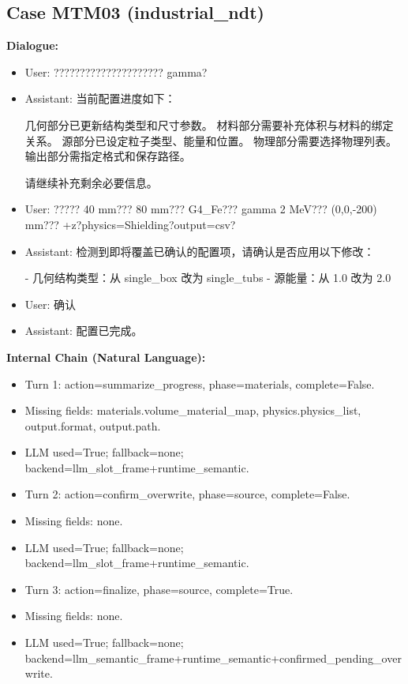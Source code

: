 \documentclass[11pt]{ctexart}
\begin{document}
\subsection{Case MTM03 (industrial\_ndt)}
\textbf{Dialogue:}
\begin{itemize}
\item User: ????????????????????? gamma?
\item Assistant: 当前配置进度如下：

几何部分已更新结构类型和尺寸参数。  
材料部分需要补充体积与材料的绑定关系。  
源部分已设定粒子类型、能量和位置。  
物理部分需要选择物理列表。  
输出部分需指定格式和保存路径。

请继续补充剩余必要信息。
\item User: ????? 40 mm??? 80 mm??? G4\_Fe??? gamma 2 MeV??? (0,0,-200) mm??? +z?physics=Shielding?output=csv?
\item Assistant: 检测到即将覆盖已确认的配置项，请确认是否应用以下修改：

- 几何结构类型：从 single\_box 改为 single\_tubs
- 源能量：从 1.0 改为 2.0
\item User: 确认
\item Assistant: 配置已完成。
\end{itemize}
\textbf{Internal Chain (Natural Language):}
\begin{itemize}
\item Turn 1: action=summarize\_progress, phase=materials, complete=False.
\item Missing fields: materials.volume\_material\_map, physics.physics\_list, output.format, output.path.
\item LLM used=True; fallback=none; backend=llm\_slot\_frame+runtime\_semantic.
\item Turn 2: action=confirm\_overwrite, phase=source, complete=False.
\item Missing fields: none.
\item LLM used=True; fallback=none; backend=llm\_slot\_frame+runtime\_semantic.
\item Turn 3: action=finalize, phase=source, complete=True.
\item Missing fields: none.
\item LLM used=True; fallback=none; backend=llm\_semantic\_frame+runtime\_semantic+confirmed\_pending\_overwrite.
\end{itemize}
\end{document}
